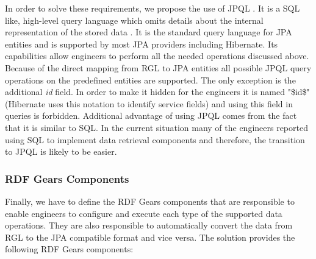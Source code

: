 In order to solve these requirements, we propose the use of JPQL \cite{linwood2010beginning}. It is a SQL like, high-level query language which omits details about the internal representation of the stored data \cite{linwood2010beginning}. It is the standard query language for JPA entities and is supported by most JPA providers including Hibernate. Its capabilities allow engineers to perform all the needed operations discussed above. Because of the direct mapping from RGL to JPA entities all possible JPQL query operations on the predefined entities are supported. The only exception is the additional \textit{id} field. In order to make it hidden for the engineers it is named "\$id\$" (Hibernate uses this notation to identify service fields) and using this field in queries is forbidden. Additional advantage of using JPQL comes from the fact that it is similar to SQL. In the current situation many of the engineers reported using SQL to implement data retrieval components and therefore, the transition to JPQL is likely to be easier.


\subsubsection{RDF Gears Components}
Finally, we have to define the RDF Gears components that are responsible to enable engineers to configure and execute each type of the supported data operations. They are also responsible to automatically convert the data from RGL to the JPA compatible format and vice versa. The solution provides the following RDF Gears components:


